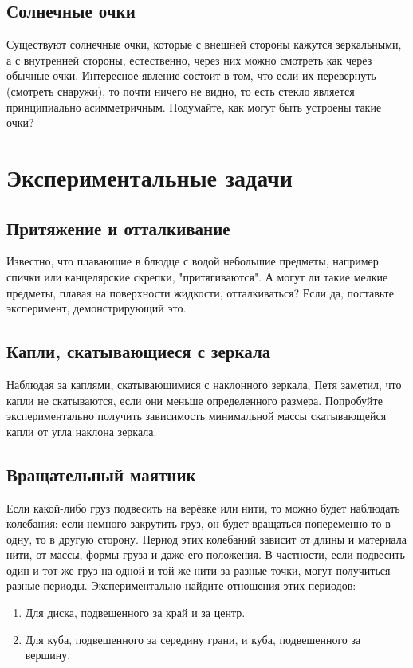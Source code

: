 \documentclass[a4paper,12pt]{article}
\begin{document}
\subsection{Солнечные очки}
Существуют солнечные очки, которые с внешней стороны кажутся зеркальными, а с внутренней стороны, естественно, через них можно смотреть как через обычные очки. Интересное явление состоит  в том, что если их перевернуть (смотреть снаружи), то почти ничего не видно, то есть стекло является принципиально асимметричным. Подумайте, как могут быть устроены такие очки?


\section{Экспериментальные задачи}

\subsection{Притяжение и отталкивание}

Известно, что плавающие в блюдце с водой небольшие предметы, например спички или канцелярские скрепки, "притягиваются". А могут ли такие мелкие предметы, плавая на поверхности жидкости, отталкиваться? Если да, поставьте эксперимент, демонстрирующий это.

\subsection{Капли, скатывающиеся с зеркала}
Наблюдая за каплями, скатывающимися с наклонного зеркала, Петя заметил, что капли не скатываются, если они меньше определенного размера. Попробуйте экспериментально получить зависимость минимальной массы скатывающейся капли от угла наклона зеркала.

\subsection{Вращательный маятник}
Если какой-либо груз подвесить на верёвке или нити, то можно будет наблюдать колебания: если немного закрутить груз, он будет вращаться попеременно то в одну, то в другую сторону. Период этих колебаний зависит от длины и материала нити, от массы, формы груза и даже его положения. В частности, если подвесить один и тот же груз на одной и той же нити за разные точки, могут получиться разные периоды. Экспериментально найдите отношения этих периодов:
\begin{enumerate}
\item Для диска, подвешенного за край и за центр.
\item Для куба, подвешенного за середину грани, и куба, подвешенного за вершину.
\end{enumerate}
\end{document}
